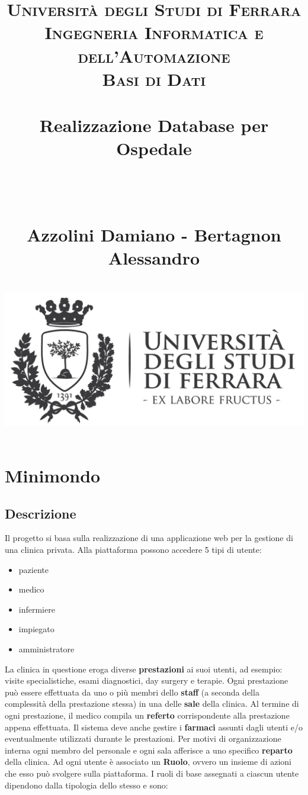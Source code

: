 \documentclass[paper=a4, fontsize=11pt,x11names]{report}
\title{
		\usefont{OT1}{bch}{b}{n}
		\normalfont \normalsize \textsc{Universit\`a degli Studi di Ferrara \\ Ingegneria Informatica e dell'Automazione
			\\ Basi di Dati} \\ [25pt]
		\horrule{0.5pt} \\[0.4cm]
		\Huge Realizzazione Database per Ospedale \date{}\\%
		\horrule{0.5pt} \\[0.4cm]
		\LARGE Azzolini Damiano - Bertagnon Alessandro \\ [0.4cm]
		\horrule{2pt} \\[0.8cm]
		\includegraphics{logoUnife}
}
\begin{document}
\maketitle

\newpage

\tableofcontents
\thispagestyle{empty}



\newpage





\chapter{Minimondo}
\section{Descrizione}
Il progetto si basa sulla realizzazione di una applicazione web per la gestione di una clinica privata. Alla piattaforma possono accedere 5 tipi di utente:
\begin{itemize}
\item paziente
\item medico
\item infermiere
\item impiegato
\item amministratore
\end{itemize}  

La clinica in questione eroga diverse \textbf{prestazioni} ai suoi utenti, ad esempio: visite specialistiche, esami diagnostici, day surgery e terapie. Ogni prestazione può essere effettuata da uno o più membri dello \textbf{staff} (a seconda della complessità della prestazione stessa) in una delle \textbf{sale} della clinica. Al termine di ogni prestazione, il medico compila un \textbf{referto} corrispondente alla prestazione appena effettuata. Il sistema deve anche gestire i \textbf{farmaci} assunti dagli utenti e/o eventualmente utilizzati durante le prestazioni. Per motivi di organizzazione interna ogni membro del personale e ogni sala afferisce a uno specifico \textbf{reparto} della clinica. Ad ogni utente è associato un \textbf{Ruolo}, ovvero un insieme di azioni che esso può svolgere sulla piattaforma. I ruoli di base assegnati a ciascun utente dipendono dalla tipologia dello stesso e sono:\\
\end{document}
